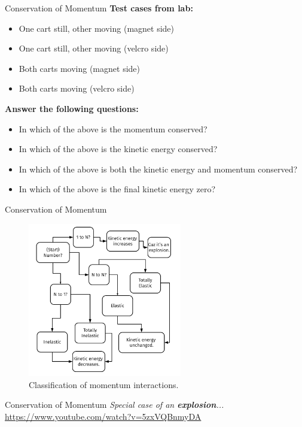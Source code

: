 \documentclass{beamer}
\begin{document}
\begin{frame}{Conservation of Momentum}
\small
\textbf{Test cases from lab:}
\begin{itemize}
\item One cart still, other moving (magnet side)
\item One cart still, other moving (velcro side)
\item Both carts moving (magnet side)
\item Both carts moving (velcro side)
\end{itemize}
\textbf{Answer the following questions:}
\begin{itemize}
\item In which of the above is the momentum conserved?
\item In which of the above is the kinetic energy conserved?
\item In which of the above is both the kinetic energy and momentum conserved?
\item In which of the above is the final kinetic energy zero?
\end{itemize}
\end{frame}

\begin{frame}{Conservation of Momentum}
\begin{figure}
\centering
\includegraphics[width=0.6\textwidth]{figures/Flow.pdf}
\caption{\label{fig:flow} Classification of momentum interactions.}
\end{figure}
\end{frame}

\begin{frame}{Conservation of Momentum}
\textit{\alert{Special case of an} \textbf{explosion}...}
\url{https://www.youtube.com/watch?v=5zxVQBnmyDA}
\end{frame}
\end{document}
